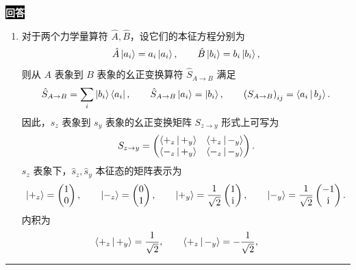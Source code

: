 \documentclass[11pt,a4paper]{ctexart}
\newenvironment{answer}
  {\par\smallskip\noindent
   \begingroup
   \setlength{\fboxsep}{4pt}%
   \colorbox{black}{\textcolor{white}{\bfseries 回答}}%
   \endgroup
   \quad\ignorespaces}
  {\par\smallskip\noindent\rule{\linewidth}{0.4pt}\medskip}
\begin{document}
\begin{answer}
  \begin{enumerate}
    \item 对于两个力学量算符 $\hat{A},\hat{B} $，设它们的本征方程分别为 
      \begin{equation}
        \hat{A} \Ket{a_i } = a_i \Ket{a_i },\qquad
        \hat{B} \Ket{b_i } = b_i \Ket{b_i },
      \end{equation}
    则从 $A $ 表象到 $B $ 表象的幺正变换算符 $\hat{S}_{A\to B} $ 满足
      \begin{equation}
        \hat{S}_{A\to B} = \sum_{i} \Ket{b_i } \Bra{a_i },\qquad
        \hat{S}_{A\to B} \Ket{a_i } = \Ket{b_i },\qquad
        \left(S_{A\to B} \right)_{ij} = \Braket{a_i | b_j }.
      \end{equation}
      因此，$s_z$ 表象到 $s_y$ 表象的幺正变换矩阵 $S_{z\to y}$ 形式上可写为
      \begin{equation}
        S_{z\to y}
        =\begin{pmatrix}
        \Braket{+_z|+_y } &\Braket{+_z|-_y } \\
        \Braket{-_z|+_y } &\Braket{-_z|-_y }
        \end{pmatrix}.
      \end{equation}
      $s_z $ 表象下，$\hat{s}_z,\hat{s}_y $ 本征态的矩阵表示为
      \begin{equation}
        \Ket{+_z }
        =\begin{pmatrix}
        1 \\
        0
        \end{pmatrix},\qquad
        \Ket{-_z }
        =\begin{pmatrix}
        0 \\
        1
        \end{pmatrix},\qquad
        \Ket{+_y }
        =\frac{1 }{\sqrt{2} } 
        \begin{pmatrix}
          1 \\
          \mathrm{i}
        \end{pmatrix},\qquad
        \Ket{-_y }
        =\frac{1 }{\sqrt{2} }
        \begin{pmatrix}
          -1 \\
          \mathrm{i}
        \end{pmatrix}.
      \end{equation}
      内积为
      \begin{equation}
        \Braket{+_z | +_y } = \frac{1 }{\sqrt{2} } ,\qquad
        \Braket{+_z | -_y } = -\frac{1 }{\sqrt{2} } ,\qquad

\end{equation}
\end{enumerate}
\end{answer}
\end{document}
